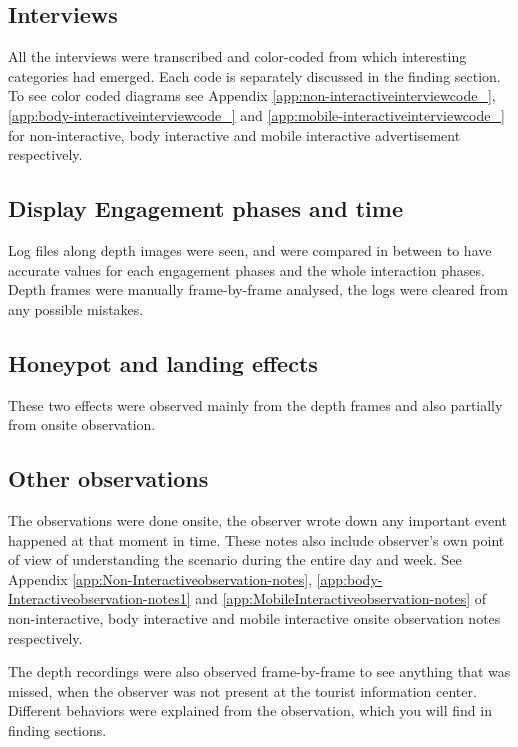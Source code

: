 \subsection {Interviews} 
All the interviews were transcribed and color-coded from which interesting categories had emerged. Each code is separately discussed in the finding section. To see color coded diagrams see Appendix \ref{app:non-interactiveinterviewcode_}, \ref{app:body-interactiveinterviewcode_} and \ref{app:mobile-interactiveinterviewcode_} for non-interactive, body interactive and mobile interactive advertisement respectively.



\subsection {Display Engagement phases and time} 
Log files along depth images were seen, and were compared in between to have accurate values for each engagement phases and the whole interaction phases. Depth frames were manually frame-by-frame analysed, the logs were cleared from any possible mistakes.

\subsection {Honeypot and landing effects}
These two effects were observed mainly from the depth frames and also partially from onsite observation.

\subsection {Other observations}
The observations were done onsite, the observer wrote down any important event happened at that moment in time. These notes also include observer's own point of view of understanding the scenario during the entire day and week. See Appendix \ref{app:Non-Interactiveobservation-notes}, \ref{app:body-Interactiveobservation-notes1} and \ref{app:MobileInteractiveobservation-notes} of non-interactive, body interactive and mobile interactive onsite observation notes respectively. 

The depth recordings were also observed frame-by-frame to see anything that was missed, when the observer was not present at the tourist information center. Different behaviors were explained from the observation, which you will find in finding sections.


